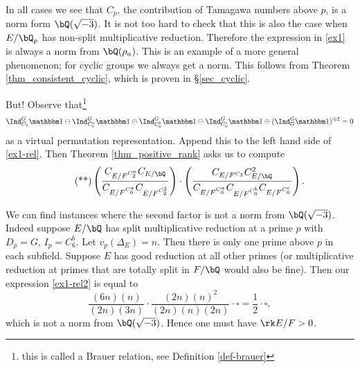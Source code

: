 \begin{example}
    In all cases we see that $C_p$, the contribution of Tamagawa numbers above $p$, is a norm form $\bQ(\sqrt{-3})$. It is not too hard to check that this is also the case when $E / \bQ_p$ has non-split multiplicative reduction. Therefore the expression in \eqref{ex1} is always a norm from $\bQ(\rho_a)$. This is an example of a more general phenomenon; for cyclic groups we always get a norm. This follows from  Theorem \ref{thm_consistent_cyclic}, which is proven in \S\ref{sec_cyclic}.

    But! Observe that{\footnote{this is called a Brauer relation, see Definition \ref{def-brauer}}} 
    \[ \Ind_{C_3}^G \trivial \ominus \Ind_{C_6^a}^G \trivial \ominus \Ind_{C_6^b}^G \trivial \ominus \Ind_{C_6^c}^G \trivial \oplus (\Ind_G^G \trivial)^{\oplus 2} = 0 \]
    as a virtual permutation representation. Append this to the left hand side of \eqref{ex1-rel}. Then Theorem \ref{thm_positive_rank} asks us to compute 
    \begin{equation}\label{ex1-rel2}\tag{**}
    \left(\frac{C_{E / F^{C_2^a}} C_{E / \bQ} }{C_{E / F^{C_6^a}} C_{E / F^{C_2^2}}}\right) \cdot \left( \frac{C_{E / F^{C_3}} C_{E / \bQ}^2}{C_{E / F^{C_6^a}}C_{E / F^{C_6^b}}  C_{E / F^{C_6^c}} } \right). 
    \end{equation}
    
    We can find instances where the second factor is not a norm from $\bQ(\sqrt{-3})$. Indeed suppose $E / \bQ$ has split multiplicative reduction at a prime $p$ with $D_p = G$, $I_p = C_6^b$. Let $v_p(\Delta_E) = n$. Then there is only one prime above $p$ in each subfield. Suppose $E$ has good reduction at all other primes (or multiplicative reduction at primes that are totally split in $F / \bQ$ would also be fine).
     Then our expression \eqref{ex1-rel2} is equal to
     \[ \frac{(6n)(n)}{(2n) (3n)} \cdot \frac{(2n)(n)^2}{(2n)(n)(2n)} \cdot \square = \frac{1}{2} \cdot \square, \] 
     which is not a norm from $\bQ(\sqrt{-3})$. Hence one must have $\rk E / F > 0$. 
\end{example}


